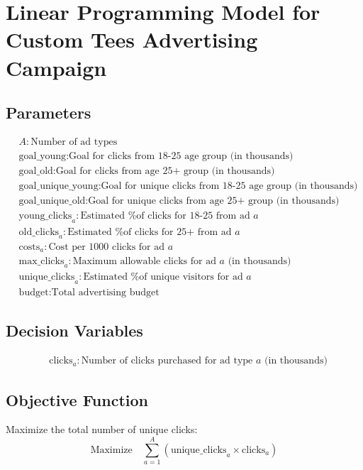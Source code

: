 \documentclass{article}
\begin{document}
\section*{Linear Programming Model for Custom Tees Advertising Campaign}

\subsection*{Parameters}
\begin{align*}
    & A: \text{Number of ad types} \\
    & \text{goal\_young}: \text{Goal for clicks from 18-25 age group (in thousands)} \\
    & \text{goal\_old}: \text{Goal for clicks from age 25+ group (in thousands)} \\
    & \text{goal\_unique\_young}: \text{Goal for unique clicks from 18-25 age group (in thousands)} \\
    & \text{goal\_unique\_old}: \text{Goal for unique clicks from age 25+ group (in thousands)} \\
    & \text{young\_clicks}_a: \text{Estimated \% of clicks for 18-25 from ad } a \\
    & \text{old\_clicks}_a: \text{Estimated \% of clicks for 25+ from ad } a \\
    & \text{costs}_a: \text{Cost per 1000 clicks for ad } a \\
    & \text{max\_clicks}_a: \text{Maximum allowable clicks for ad } a \text{ (in thousands)} \\
    & \text{unique\_clicks}_a: \text{Estimated \% of unique visitors for ad } a \\
    & \text{budget}: \text{Total advertising budget}
\end{align*}

\subsection*{Decision Variables}
\begin{align*}
    & \text{clicks}_a: \text{Number of clicks purchased for ad type } a \text{ (in thousands)}
\end{align*}

\subsection*{Objective Function}
Maximize the total number of unique clicks:
\[
\text{Maximize} \quad \sum_{a=1}^{A} \left( \text{unique\_clicks}_a \times \text{clicks}_a \right)
\]
\end{document}
